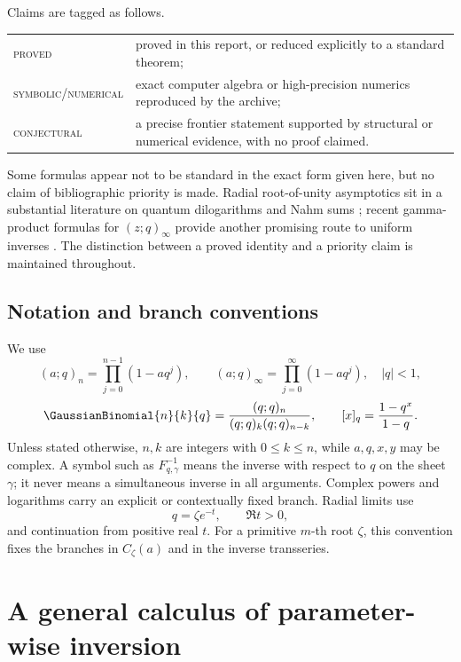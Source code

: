 \documentclass[11pt,letterpaper,oneside,openany]{book}
\theoremstyle{definition}
\theoremstyle{remark}
\newcommand{\statusproved}{\textcolor{provedgreen}{\textsc{proved}}}
\newcommand{\statusnumerical}{\textcolor{numericalblue}{\textsc{symbolic/numerical}}}
\newcommand{\statusconjectural}{\textcolor{conjectureorange}{\textsc{conjectural}}}
\begin{document}
Claims are tagged as follows.
\begin{center}
\begin{tabularx}{0.92\textwidth}{@{}l>{\raggedright\arraybackslash}X@{}}
\toprule
\statusproved & proved in this report, or reduced explicitly to a standard theorem;\\
\statusnumerical & exact computer algebra or high-precision numerics reproduced by the archive;\\
\statusconjectural & a precise frontier statement supported by structural or numerical evidence, with no proof claimed.\\
\bottomrule
\end{tabularx}
\end{center}
Some formulas appear not to be standard in the exact form given here, but no
claim of bibliographic priority is made.  Radial root-of-unity asymptotics sit
in a substantial literature on quantum dilogarithms and Nahm sums
\cite{IpYamazaki,GaroufalidisZagier}; recent gamma-product formulas for
\((z;q)_\infty\) provide another promising route to uniform inverses
\cite{ArdehaliRosengren}.  The distinction between a proved identity and a
priority claim is maintained throughout.

\chapter*{Notation and branch conventions}
We use
\[
 (a;q)_n=\prod_{j=0}^{n-1}(1-aq^j),
 \qquad
 (a;q)_\infty=\prod_{j=0}^{\infty}(1-aq^j),\quad |q|<1,
\]
\[
 \GaussianBinomial{n}{k}{q}=\frac{(q;q)_n}{(q;q)_k(q;q)_{n-k}},
 \qquad
 [x]_q=\frac{1-q^x}{1-q}.
\]
Unless stated otherwise, \(n,k\) are integers with \(0\le k\le n\), while
\(a,q,x,y\) may be complex.  A symbol such as \(F^{-1}_{q,\gamma}\) means the
inverse with respect to \(q\) on the sheet \(\gamma\); it never means a
simultaneous inverse in all arguments.  Complex powers and logarithms carry an
explicit or contextually fixed branch.  Radial limits use
\[
 q=\zeta e^{-t},\qquad \Re t>0,
\]
and continuation from positive real \(t\).  For a primitive \(m\)-th root
\(\zeta\), this convention fixes the branches in \(C_\zeta(a)\) and in the
inverse transseries.

\tableofcontents
\listoffigures
\listoftables

\mainmatter

\part{A general calculus of parameter-wise inversion}
\end{document}
